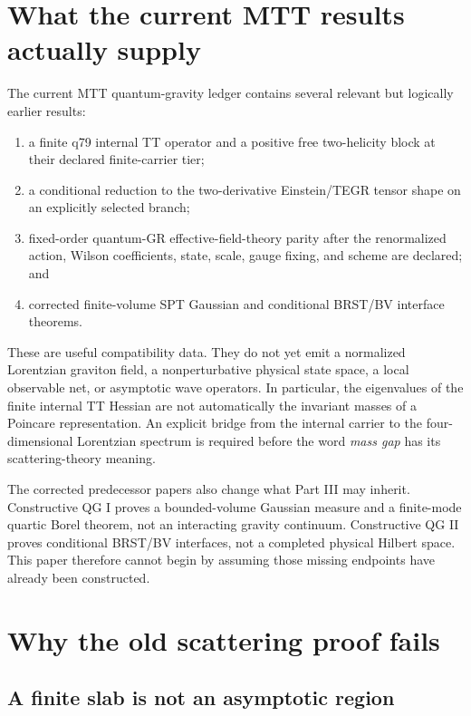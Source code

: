 \documentclass[11pt]{article}
\begin{document}
\section{What the current MTT results actually supply}

The current MTT quantum-gravity ledger contains several relevant but logically
earlier results:
\begin{enumerate}
\item a finite q79 internal TT operator and a positive free two-helicity block
at their declared finite-carrier tier;
\item a conditional reduction to the two-derivative Einstein/TEGR tensor
shape on an explicitly selected branch;
\item fixed-order quantum-GR effective-field-theory parity after the
renormalized action, Wilson coefficients, state, scale, gauge fixing, and
scheme are declared; and
\item corrected finite-volume SPT Gaussian and conditional BRST/BV interface
theorems.
\end{enumerate}

These are useful compatibility data. They do not yet emit a normalized
Lorentzian graviton field, a nonperturbative physical state space, a local
observable net, or asymptotic wave operators. In particular, the eigenvalues
of the finite internal TT Hessian are not automatically the invariant masses
of a Poincare representation. An explicit bridge from the internal carrier to
the four-dimensional Lorentzian spectrum is required before the word
\emph{mass gap} has its scattering-theory meaning.

The corrected predecessor papers also change what Part III may inherit.
Constructive QG I proves a bounded-volume Gaussian measure and a finite-mode
quartic Borel theorem, not an interacting gravity continuum. Constructive QG
II proves conditional BRST/BV interfaces, not a completed physical Hilbert
space. This paper therefore cannot begin by assuming those missing endpoints
have already been constructed.

\section{Why the old scattering proof fails}

\subsection{A finite slab is not an asymptotic region}
\end{document}
